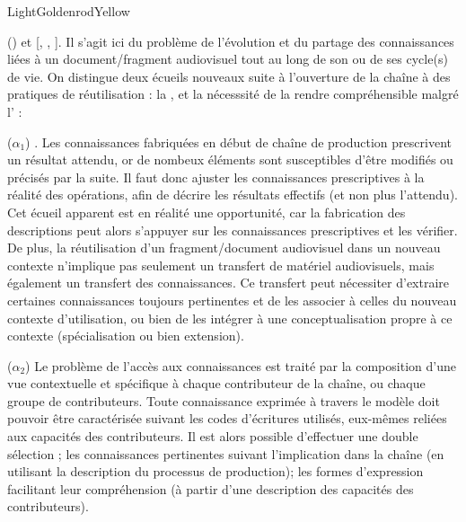 \begin{problemes}{LightGoldenrodYellow}
\begin{liste}
 	\item[(\g{$\alpha$})] et  [, , ].
 	Il s'agit ici du problème de l'évolution et du partage des connaissances liées à un document/fragment audiovisuel tout au long de son ou de ses cycle(s) de vie. 
 	On distingue deux écueils nouveaux suite à l'ouverture de la chaîne à des pratiques de réutilisation : la , et la nécesssité de la rendre compréhensible malgré l' : 
 	\begin{listeni}
 		\item[($\alpha_1$)] .
 		Les connaissances fabriquées en début de chaîne de production prescrivent un résultat attendu, or de nombeux éléments sont susceptibles d'être modifiés ou précisés par la suite.
 		Il faut donc ajuster les connaissances prescriptives à la réalité des opérations, afin de décrire les résultats effectifs (et non plus l'attendu).
 		Cet écueil apparent est en réalité une opportunité, car la fabrication des descriptions peut alors s'appuyer sur les connaissances prescriptives et les vérifier. 
		De plus, la réutilisation d'un fragment/document audiovisuel dans un nouveau contexte n'implique pas seulement un transfert de matériel audiovisuels, mais également un transfert des connaissances. %
		Ce transfert peut nécessiter d'extraire certaines connaissances toujours pertinentes et de les associer à celles du nouveau contexte d'utilisation, ou bien de les intégrer à une conceptualisation propre à ce contexte (spécialisation ou bien extension).

		\item[($\alpha_2$)] 
 		Le problème de l'accès aux connaissances est traité par la composition d'une vue contextuelle et spécifique à chaque contributeur de la chaîne, ou chaque groupe de contributeurs.
 		Toute connaissance exprimée à travers le modèle doit pouvoir être caractérisée suivant les codes d'écritures utilisés, eux-mêmes reliées aux capacités des contributeurs.
		Il est alors possible d'effectuer une double sélection ; les connaissances pertinentes suivant l'implication dans la chaîne (en utilisant la description du processus de production); les formes d'expression facilitant leur compréhension (à partir d'une description des capacités des contributeurs).
 	\end{listeni}
\end{liste}
\end{problemes}

